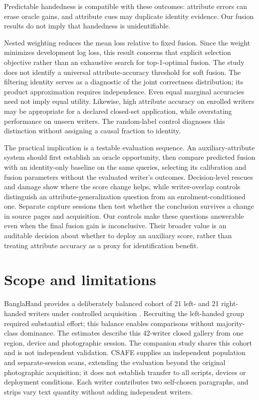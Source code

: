 \documentclass[ASNA,twocolumn]{USG}
\begin{document}
Predictable handedness \cite{prappo2026handedness} is compatible with these outcomes: attribute errors can erase oracle gains, and attribute cues may duplicate identity evidence. Our fusion results do not imply that handedness is unidentifiable.

Nested weighting reduces the mean loss relative to fixed fusion. Since the weight minimizes development log loss, this result concerns that explicit selection objective rather than an exhaustive search for top-1-optimal fusion. The study does not identify a universal attribute-accuracy threshold for soft fusion. The filtering identity serves as a diagnostic of the joint correctness distribution; its product approximation requires independence. Even equal marginal accuracies need not imply equal utility. Likewise, high attribute accuracy on enrolled writers may be appropriate for a declared closed-set application, while overstating performance on unseen writers. The random-label control diagnoses this distinction without assigning a causal fraction to identity.




The practical implication is a testable evaluation sequence. An auxiliary-attribute system should first establish an oracle opportunity, then compare predicted fusion with an identity-only baseline on the same queries, selecting its calibration and fusion parameters without the evaluated writer's outcomes. Decision-level rescues and damage show where the score change helps, while writer-overlap controls distinguish an attribute-generalization question from an enrolment-conditioned one. Separate capture sessions then test whether the conclusion survives a change in source pages and acquisition. Our controls make these questions answerable even when the final fusion gain is inconclusive. Their broader value is an auditable decision about whether to deploy an auxiliary score, rather than treating attribute accuracy as a proxy for identification benefit.

\section{Scope and limitations}
BanglaHand provides a deliberately balanced cohort of 21 left- and 21 right-handed writers under controlled acquisition \cite{banglahand2026data}. Recruiting the left-handed group required substantial effort; this balance enables comparisons without majority-class dominance. The estimates describe this 42-writer closed gallery from one region, device and photographic session. The companion study shares this cohort and is not independent validation. CSAFE supplies an independent population and separate-session scans, extending the evaluation beyond the original photographic acquisition; it does not establish transfer to all scripts, devices or deployment conditions. Each writer contributes two self-chosen paragraphs, and strips vary text quantity without adding independent writers.
\end{document}
